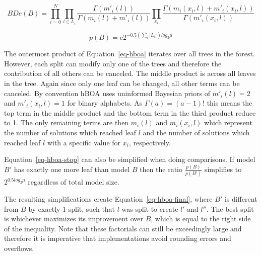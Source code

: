 \documentclass[twoside]{article}
\begin{document}
\begin{equation}
  BDe(B) = \prod_{i=0}^{N}\prod_{l\in L_i} \frac{\Gamma(m'_i(l))}{\Gamma(m_i(l) + m'_i(l))}
  \prod_{x_i}\frac{\Gamma(m_i(x_i, l) + m'_i(x_i,l))}{\Gamma(m'_i(x_i,l))}
  \label{eq-hboa}
\end{equation}

\begin{equation}
  p(B) = c2^{-0.5(\sum_i|L_i|)log_2\mu}
  \label{eq-hboa-stop}
\end{equation}

The outermost product of Equation~\ref{eq-hboa} iterates over all trees in the forest. However, each split
can modify only one of the trees and therefore the contribution of all others can be canceled. The middle
product is across all leaves in the tree. Again since only one leaf can be changed, all other terms can
be canceled. By convention hBOA uses uninformed Bayesian priors of $m'_i(l)= 2$ and $m'_i(x_i, l)=1$ for
binary alphabets. As $\Gamma(a) = (a-1)!$ this means the top term in the middle product and the bottom
term in the third product reduce to 1. The only remaining terms are then $m_i(l)$ and $m_i(x_i, l)$ which
represent the number of solutions which reached leaf $l$ and the number of solutions which reached leaf $l$
with a specific value for $x_i$, respectively.

Equation~\ref{eq-hboa-stop} can also be simplified when doing comparisons. If model $B'$ has exactly one more
leaf than model $B$ then the ratio $\frac{p(B)}{p(B')}$ simplifies to $2^{0.5 log_2\mu}$ regardless of
total model size.

The resulting simplifications create Equation~\ref{eq-hboa-final},
where $B'$ is different from $B$ by exactly 1 split, such that $l$ was split to create $l'$ and $l''$.
The best split is whichever maximizes its improvement over $B$, which is equal to the right side
of the inequality. Note that these factorials can still be exceedingly large and
therefore it is imperative that implementations avoid rounding errors and overflows.
\end{document}
